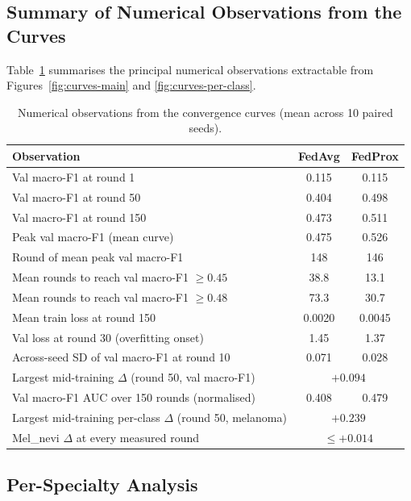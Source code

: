 \documentclass[11pt,a4paper]{article}
\begin{document}
\subsection{Summary of Numerical Observations from the Curves}
Table~\ref{tab:curve-stats} summarises the principal numerical
observations extractable from Figures~\ref{fig:curves-main} and
\ref{fig:curves-per-class}.

\begin{table}[!htbp]
\centering
\small
\begin{tabular}{lcc}
\toprule
Observation & FedAvg & FedProx \\
\midrule
Val macro-F1 at round 1                 & 0.115 & 0.115 \\
Val macro-F1 at round 50                & 0.404 & 0.498 \\
Val macro-F1 at round 150               & 0.473 & 0.511 \\
Peak val macro-F1 (mean curve)          & 0.475 & 0.526 \\
Round of mean peak val macro-F1         & 148   & 146 \\
Mean rounds to reach val macro-F1 $\geq 0.45$ & 38.8 & 13.1 \\
Mean rounds to reach val macro-F1 $\geq 0.48$ & 73.3 & 30.7 \\
Mean train loss at round 150            & 0.0020 & 0.0045 \\
Val loss at round 30 (overfitting onset)& 1.45  & 1.37 \\
Across-seed SD of val macro-F1 at round 10 & 0.071 & 0.028 \\
\midrule
Largest mid-training $\Delta$ (round 50, val macro-F1)         & \multicolumn{2}{c}{$+0.094$} \\
Val macro-F1 AUC over 150 rounds (normalised)                  & 0.408 & 0.479 \\
Largest mid-training per-class $\Delta$ (round 50, melanoma)    & \multicolumn{2}{c}{$+0.239$} \\
Mel\_nevi $\Delta$ at every measured round                      & \multicolumn{2}{c}{$\leq +0.014$} \\
\bottomrule
\end{tabular}
\caption{Numerical observations from the convergence curves (mean across 10 paired seeds).}
\label{tab:curve-stats}
\end{table}

\subsection{Per-Specialty Analysis}
\end{document}

